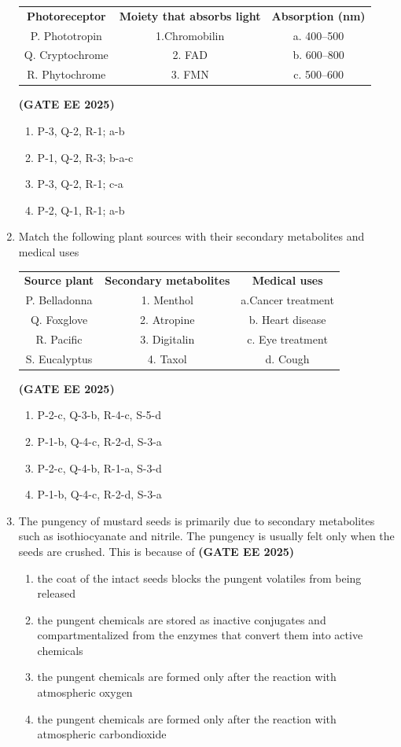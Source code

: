\documentclass[journal,12pt,onecolumn]{IEEEtran}
\theoremstyle{remark}
\begin{document}
\begin{enumerate}
\begin{tabular}{c c c}
\textbf{Photoreceptor} & \textbf{Moiety that absorbs light} & \textbf{Absorption (nm)}\\
P. Phototropin & 1.Chromobilin & a. 400--500 \\
Q. Cryptochrome & 2. FAD & b. 600--800 \\
R. Phytochrome & 3. FMN & c. 500--600 \\


\end{tabular} \hfill \textbf{(GATE EE 2025)}
\begin{enumerate} 
\item P-3, Q-2, R-1; a-b
\item P-1, Q-2, R-3; b-a-c
\item P-3, Q-2, R-1; c-a
\item P-2, Q-1, R-1; a-b
\end{enumerate}

\item Match the following plant sources with their secondary metabolites and medical uses \\
\begin{tabular}{c c c}

\textbf{Source plant} & \textbf{Secondary metabolites} & \textbf{Medical uses}\\
P. Belladonna &1. Menthol & a.Cancer treatment  \\
Q. Foxglove & 2. Atropine & b. Heart disease \\
R. Pacific & 3. Digitalin & c. Eye treatment \\
S. Eucalyptus & 4. Taxol & d.  Cough\\
\end{tabular} \hfill \textbf{(GATE EE 2025)}
\begin{enumerate} 
\item P-2-c, Q-3-b, R-4-c, S-5-d
\item P-1-b, Q-4-c, R-2-d, S-3-a
\item P-2-c, Q-4-b, R-1-a, S-3-d
\item P-1-b, Q-4-c, R-2-d, S-3-a
\end{enumerate}

\item The pungency of mustard seeds is primarily due to secondary metabolites such as isothiocyanate and nitrile. The pungency is usually felt only when the seeds are crushed. This is because of \hfill \textbf{(GATE EE 2025)}
\begin{enumerate} 
\item the coat of the intact seeds blocks the pungent volatiles from being released
\item the pungent chemicals are stored as inactive conjugates and compartmentalized from the enzymes that convert them into active chemicals
\item the pungent chemicals are formed only after the reaction with atmospheric oxygen
\item the pungent chemicals are formed only after the reaction with atmospheric carbondioxide
\end{enumerate}


\end{enumerate}
\end{document}
